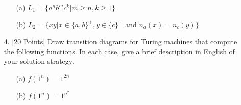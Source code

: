 \documentclass[12pt]{article}
\begin{document}
\begin{spacing}{1.5}
\begin{enumerate}
                  \begin{enumerate}
                        \item[(a)] $L_1 = \{a^nb^mc^k | m \geq n, k \geq 1 \}$


                        \item[(b)] $L_2 = \{xy | x \in \{a,b \}^+, y \in \{c\}^+ \text{ and } n_a(x)=n_c(y) \}$


                  \end{enumerate}

                  \newpage
            \item[4.] [20 Points] Draw transition diagrams for Turing machines that compute the following functions. In each case, give a brief description in English of your solution strategy.

                  \begin{enumerate}
                        \item[(a)] $f(1^n) = 1^{2n}$

                        \item[(b)] $f(1^n) = 1^{n^2}$

                  \end{enumerate}

      \end{enumerate}

\end{spacing}
\end{document}
